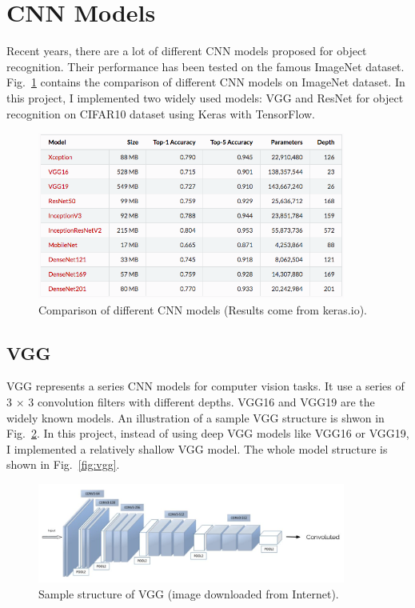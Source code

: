 \section{CNN Models}
Recent years, there are a lot of different CNN models proposed for object recognition. Their performance has been tested on the famous ImageNet dataset. Fig.~\ref{fig:comparison} contains the comparison of different CNN models on ImageNet dataset. In this project, I implemented two widely used models: VGG and ResNet for object recognition on CIFAR10 dataset using Keras with TensorFlow.

\begin{figure}[htbp]
\centering
\includegraphics[width=0.9\textwidth]{./figures/comparison.png}
\caption{Comparison of different CNN models (Results come from keras.io).}
\label{fig:comparison} 
\end{figure}

\subsection{VGG}
VGG represents a series CNN models for computer vision tasks. It use a series of 3 $\times$ 3 convolution filters with different depths. VGG16 and VGG19 are the widely known models. An illustration of a sample VGG structure is shwon in Fig.~\ref{fig:vgg_sample}. In this project, instead of using deep VGG models like VGG16 or VGG19, I implemented a relatively shallow VGG model. The whole model structure is shown in Fig.~\ref{fig:vgg}.

\begin{figure}[htbp]
\centering
\includegraphics[width=0.9\textwidth]{./figures/vgg_image.jpeg}
\caption{Sample structure of VGG (image downloaded from Internet).}
\label{fig:vgg_sample} 
\end{figure}



